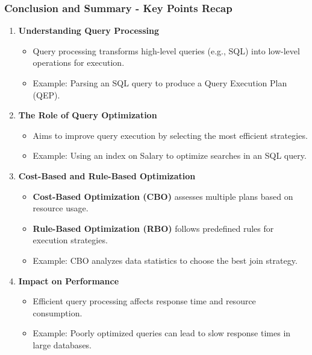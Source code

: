 \documentclass[aspectratio=169]{beamer}
\begin{document}
\begin{frame}[fragile]
    \frametitle{Conclusion and Summary - Key Points Recap}
    
    \begin{enumerate}
        \item \textbf{Understanding Query Processing}
        \begin{itemize}
            \item Query processing transforms high-level queries (e.g., SQL) into low-level operations for execution.
            \item Example: Parsing an SQL query to produce a Query Execution Plan (QEP).
        \end{itemize}
        
        \item \textbf{The Role of Query Optimization}
        \begin{itemize}
            \item Aims to improve query execution by selecting the most efficient strategies.
            \item Example: Using an index on Salary to optimize searches in an SQL query.
        \end{itemize}
        
        \item \textbf{Cost-Based and Rule-Based Optimization}
        \begin{itemize}
            \item \textbf{Cost-Based Optimization (CBO)} assesses multiple plans based on resource usage.
            \item \textbf{Rule-Based Optimization (RBO)} follows predefined rules for execution strategies.
            \item Example: CBO analyzes data statistics to choose the best join strategy.
        \end{itemize}
        
        \item \textbf{Impact on Performance}
        \begin{itemize}
            \item Efficient query processing affects response time and resource consumption.
            \item Example: Poorly optimized queries can lead to slow response times in large databases.
        \end{itemize}
    \end{enumerate}
\end{frame}
\end{document}
